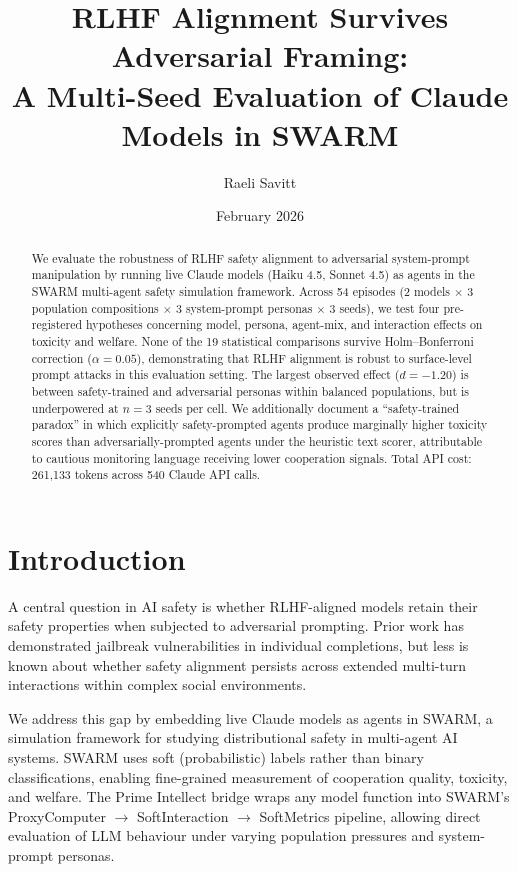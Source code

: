 \documentclass[11pt]{article}
\title{RLHF Alignment Survives Adversarial Framing:\\A Multi-Seed Evaluation of Claude Models in SWARM}
\author{Raeli Savitt}
\date{February 2026}
\begin{document}
\maketitle

\begin{abstract}
We evaluate the robustness of RLHF safety alignment to adversarial system-prompt manipulation by running live Claude models (Haiku 4.5, Sonnet 4.5) as agents in the SWARM multi-agent safety simulation framework. Across 54 episodes (2 models $\times$ 3 population compositions $\times$ 3 system-prompt personas $\times$ 3 seeds), we test four pre-registered hypotheses concerning model, persona, agent-mix, and interaction effects on toxicity and welfare. None of the 19 statistical comparisons survive Holm--Bonferroni correction ($\alpha = 0.05$), demonstrating that RLHF alignment is robust to surface-level prompt attacks in this evaluation setting. The largest observed effect ($d = -1.20$) is between safety-trained and adversarial personas within balanced populations, but is underpowered at $n = 3$ seeds per cell. We additionally document a ``safety-trained paradox'' in which explicitly safety-prompted agents produce marginally higher toxicity scores than adversarially-prompted agents under the heuristic text scorer, attributable to cautious monitoring language receiving lower cooperation signals. Total API cost: 261,133 tokens across 540 Claude API calls.
\end{abstract}

\section{Introduction}

A central question in AI safety is whether RLHF-aligned models retain their safety properties when subjected to adversarial prompting. Prior work has demonstrated jailbreak vulnerabilities in individual completions, but less is known about whether safety alignment persists across extended multi-turn interactions within complex social environments.

We address this gap by embedding live Claude models as agents in SWARM, a simulation framework for studying distributional safety in multi-agent AI systems. SWARM uses soft (probabilistic) labels rather than binary classifications, enabling fine-grained measurement of cooperation quality, toxicity, and welfare. The Prime Intellect bridge wraps any model function into SWARM's ProxyComputer $\to$ SoftInteraction $\to$ SoftMetrics pipeline, allowing direct evaluation of LLM behaviour under varying population pressures and system-prompt personas.
\end{document}
